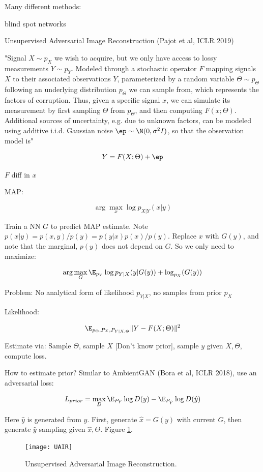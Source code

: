 \documentclass[english]{article}
\begin{document}
Many different methods:

blind spot networks

\item Unsupervised Adversarial Image Reconstruction (Pajot et al, ICLR 2019)

"Signal $X \sim p_X$ we wish to acquire, but we only have access to lossy measurements $Y \sim p_Y$. Modeled through a
stochastic operator $F$ mapping signals $X$ to their associated observations $Y$, parameterized by a random variable
$\Theta \sim p_\Theta$ following an underlying distribution $p_\Theta$ we can sample from, which represents the factors
of corruption. Thus, given a specific signal $x$, we can simulate its measurement by first sampling
$\Theta$ from $p_\Theta$, and then computing $F(x;\Theta)$. Additional sources of uncertainty, e.g. due to unknown
factors, can be modeled using additive i.i.d. Gaussian noise $\ep \sim \N(0,\sigma^2I)$, so that the
observation model is"

$$Y = F(X;\Theta) + \ep$$ 

$F$ diff in $x$

MAP: 

$$\arg\max_x \log p_{X|Y}(x|y)$$

Train a NN $G$ to predict MAP estimate. Note $p(x|y) = p(x,y)/p(y) = p(y|x)p(x)/p(y)$. Replace $x$ with $G(y)$, and note that the marginal, $p(y)$ does not depend on $G$. So we only need to maximize:

$$\arg\max_G \E_{p_Y}\log p_{Y|X}(y|G(y))+\log_{p_X}(G(y))$$

Problem: No analytical form of likelihood $p_{Y|X}$, no samples from prior $p_X$

Likelihood: 

$$\E_{p_\Theta,P_X,P_{Y|X,\Theta}}\|Y-F(X;\Theta)\|^2$$

Estimate via: Sample $\Theta$, sample $X$ [Don't know prior], sample $y$ given $X,\Theta$, compute loss. 

How to estimate prior? Similar to AmbientGAN (Bora et al, ICLR 2018), use an adversarial loss:

$$L_{prior} = \max_D 
\E_{P_{Y}}\log D(y)
- 
\E_{P_{\hat Y}}\log D(\hat  y)$$

Here $\hat y$ is generated from $y$. First, generate $\hat x = G(y)$ with current $G$, then generate $\hat y$ sampling given $\hat x,\Theta$. Figure \ref{UAIR}.

\begin{figure}
  \centering
  \texttt{[image: UAIR]}
  \caption{Unsupervised Adversarial Image Reconstruction.}
  \label{UAIR} 
\end{figure}
\end{document}
